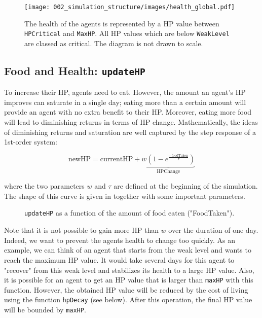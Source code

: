 \begin{figure}[htb]
    \centering
    \texttt{[image: 002\_simulation\_structure/images/health\_global.pdf]}
    \caption{The health of the agents is represented by a HP value between \lstinline$HPCritical$ and \lstinline$MaxHP$. All HP values which are below \lstinline$WeakLevel$ are classed as critical. The diagram is not drawn to scale.}
    \label{fig:health_system}
\end{figure}

\subsection{Food and Health: \lstinline$updateHP$}\label{updateHP}
To increase their HP, agents need to eat. However, the amount an agent's HP improves can saturate in a single day; eating more than a certain amount will provide an agent with no extra benefit to their HP. Moreover, eating more food will lead to diminishing returns in terms of HP change. Mathematically, the ideas of diminishing returns and saturation are well captured by the step response of a 1st-order system:

\begin{equation}\label{updateHP_general}
   \text{newHP}= \text{currentHP} +\underbrace{w(1-e^{\frac{-\text{foodTaken}}{\tau}})}_{\text{HPChange}}
\end{equation}

where the two parameters $w$ and $\tau$ are defined at the beginning of the simulation. The shape of this curve is given in  together with some important parameters.

\begin{figure}[htb]%
    \centering
    \qquad
    \caption{\texttt{updateHP} as a function of the amount of food eaten ("FoodTaken").}%
    \label{fig:updateHP}%
\end{figure}

Note that it is not possible to gain more HP than $w$ over the duration of one day. Indeed, we want to prevent the agents health to change too quickly. As an example, we can think of an agent that starts from the weak level and wants to reach the maximum HP value. It would take several days for this agent to "recover" from this weak level and stabilizes its health to a large HP value. Also, it is possible for an agent to get an HP value that is larger than \texttt{maxHP} with this function. However, the obtained HP value will be reduced by the cost of living using the function \texttt{hpDecay} (see below). After this operation, the final HP value will be bounded by \texttt{maxHP}.


